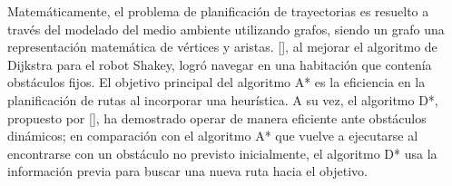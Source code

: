 Matem\'{a}ticamente, el problema de planificación de trayectorias es resuelto a través del modelado del medio ambiente utilizando grafos, siendo un grafo una representaci\'{o}n matem\'{a}tica de v\'{e}rtices y aristas. \citeauthor{4082128}[], al mejorar el algoritmo de Dijkstra para el robot Shakey, logr\'{o} navegar en una habitaci\'{o}n que conten\'{i}a obst\'{a}culos fijos. El objetivo principal del algoritmo A* es la eficiencia en la planificaci\'{o}n de rutas al incorporar una heurística. A su vez, el algoritmo D*, propuesto por \citeauthor{351061}[], ha demostrado operar de manera eficiente ante obst\'{a}culos din\'{a}micos; en comparaci\'{o}n con el algoritmo A* que vuelve a ejecutarse al encontrarse con un obst\'{a}culo no previsto inicialmente, el algoritmo D* usa la informaci\'{o}n previa para buscar una nueva ruta hacia el objetivo.

